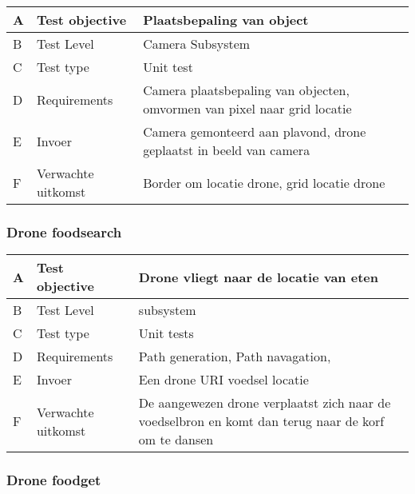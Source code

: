 \begin{table}[hbt!]
    \begin{tabular}[t]{|m{0.3cm}|m{3.2cm}|m{7.5cm}|}\hline
    A & Test objective & Plaatsbepaling van object \\ \hline
    B & Test Level & Camera Subsystem\\ \hline
    C & Test type & Unit test\\ \hline
    D & Requirements & Camera plaatsbepaling van objecten, omvormen van pixel naar grid locatie\\ \hline
    E & Invoer & Camera gemonteerd aan plavond, drone geplaatst in beeld van camera \\ \hline
    F & Verwachte uitkomst & Border om locatie drone, grid locatie drone\\ \hline
    \end{tabular}
\end{table}

\newpage

\subsubsection{Drone foodsearch}

\begin{table}[hbt!]
    \begin{tabular}[t]{|m{0.3cm}|m{3.2cm}|m{7.5cm}|}\hline
    A & Test objective & Drone vliegt naar de locatie van eten\\ \hline
    B & Test Level & subsystem\\ \hline
    C & Test type & Unit tests\\ \hline
    D & Requirements & Path generation, Path navagation, \\ \hline
    E & Invoer & Een drone URI voedsel locatie\\ \hline
    F & Verwachte uitkomst & De aangewezen drone verplaatst zich naar de voedselbron en komt dan terug naar de korf om te dansen\\ \hline
    \end{tabular}
\end{table}

\subsubsection{Drone foodget}

